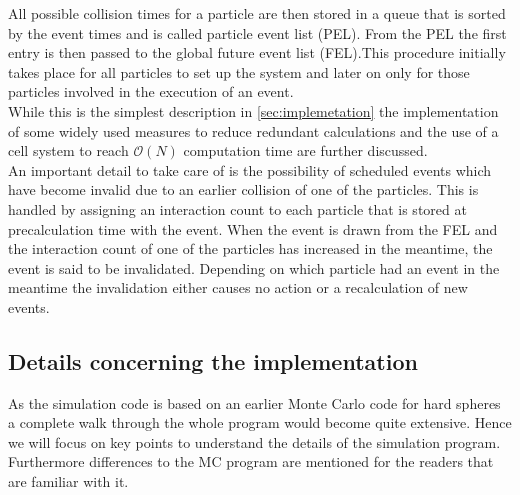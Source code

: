 All possible collision times for a particle are then stored in a queue that is sorted by the event times and is called particle event list (PEL). From the PEL the first entry is then passed to the global future event list (FEL).This procedure initially takes place for all particles to set up the system and later on only for those particles involved in the execution of an event.\\

While this is the simplest description in \autoref{sec:implemetation} the implementation of some widely used measures to reduce redundant calculations and the use of a cell system to reach $\mathcal{O}(N)$ computation time are further discussed.\\

An important detail to take care of is the possibility of scheduled events which have become invalid due to an earlier collision of one of the particles. This is handled by assigning an interaction count to each particle that is stored at precalculation time with the event. When the event is drawn from the FEL and the interaction count of one of the particles has increased in the meantime, the event is said to be invalidated. Depending on which particle had an event in the meantime the invalidation either causes no action or a recalculation of new events.

\subsection{Details concerning the implementation} 
\label{sec:implemetation}
As the simulation code is based on an earlier Monte Carlo code for hard spheres a complete walk through the whole program would become quite extensive. Hence we will focus on key points to understand the details of the simulation program. Furthermore differences to the MC program are mentioned for the readers that are familiar with it.

